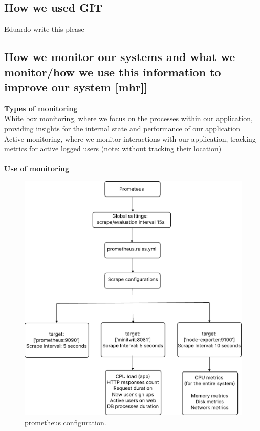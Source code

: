 \documentclass{article}
\begin{document}
\subsection{How we used GIT}
Eduardo write this please

\subsection{How we monitor our systems and what we monitor/how we use this information to improve our system [mhr]]}

\noindent \textbf{\underline{Types of monitoring}} 
\\White box monitoring, where we focus on the processes within our application, providing insights for the internal state and performance of our application\\
Active monitoring, where we monitor interactions with our application, tracking metrics for active logged users (note: without tracking their location)
\\
\\
\noindent \textbf{\underline{Use of monitoring}} 

\begin{figure}[ht]
    \centering
    \includegraphics[width=1.0\textwidth]{./pdfs/prometheus configuration.pdf} 
    \caption{prometheus configuration.}
    \label{fig:Prometheus configuration}
\end{figure}
\end{document}
